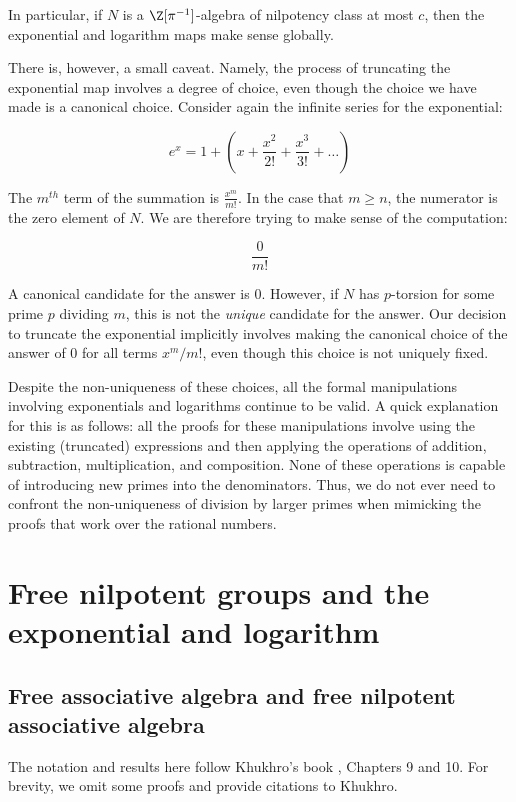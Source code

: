 \documentclass{ucetd}
\begin{document}
In particular, if $N$ is a $\Z[\pi^{-1}]$-algebra of nilpotency class
at most $c$, then the exponential and logarithm maps make sense globally.

There is, however, a small caveat. Namely, the process of truncating
the exponential map involves a degree of choice, even though the
choice we have made is a canonical choice. Consider again the infinite
series for the exponential:

$$e^x = 1 + \left(x + \frac{x^2}{2!} + \frac{x^3}{3!} + \dots\right)$$

The $m^{th}$ term of the summation is $\frac{x^m}{m!}$. In the case
that $m \ge n$, the numerator is the zero element of $N$. We are
therefore trying to make sense of the computation:

$$\frac{0}{m!}$$

A canonical candidate for the answer is $0$. However, if $N$ has
$p$-torsion for some prime $p$ dividing $m$, this is not the {\em
  unique} candidate for the answer. Our decision to truncate the
exponential implicitly involves making the canonical choice of the
answer of $0$ for all terms $x^m/m!$, even though this choice is not
uniquely fixed. 

Despite the non-uniqueness of these choices, all the formal
manipulations involving exponentials and logarithms continue to be
valid. A quick explanation for this is as follows: all the proofs for
these manipulations involve using the existing (truncated) expressions
and then applying the operations of addition, subtraction,
multiplication, and composition. None of these operations is capable
of introducing new primes into the denominators. Thus, we do not ever
need to confront the non-uniqueness of division by larger primes when
mimicking the proofs that work over the rational numbers.

\section{Free nilpotent groups and the exponential and logarithm}\label{sec:free-nilpotent-exp-log}

\subsection{Free associative algebra and free nilpotent associative algebra}\label{sec:free-associative-algebra}

The notation and results here follow Khukhro's book \cite{Khukhro},
Chapters 9 and 10. For brevity, we omit some proofs and provide
citations to Khukhro.
\end{document}
